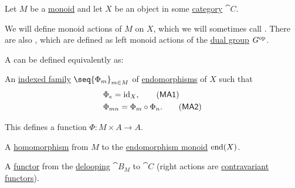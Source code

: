 \begin{definition}\label{def:monoid_action}
  Let \( M \) be a \hyperref[def:unital_magma/monoid]{monoid} and let \( X \) be an object in some \hyperref[def:category]{category} \( \cat{C} \).

  We will define monoid actions of \( M \) on \( X \), which we will sometimes call . There are also , which are defined as left monoid actions of the \hyperref[def:group/duality]{dual group} \( G^{\operatorname{op}} \).

  A  can be defined equivalently as:
  \begin{thmenum}
     An \hyperref[def:cartesian_product/indexed_family]{indexed family} \( \seq{ \Phi_m }_{m \in M} \) of \hyperref[def:morphism_invertibility/endomorphism]{endomorphisms} of \( X \) such that
    \begin{align}
      &\Phi_e = \id_X, \label{eq:def:monoid_action/family/identity}\tag{\logic{MA1}} \\
      &\Phi_{mn} = \Phi_m \bincirc \Phi_n. \label{eq:def:monoid_action/family/compatibility}\tag{\logic{MA2}}
    \end{align}

    This defines a function \( \Phi: M \times A \to A \).

     A \hyperref[def:unital_magma/homomorphism]{homomorphism} from \( M \) to the \hyperref[def:endomorphism_monoid]{endomorphism monoid} \( \operatorname{end}(X) \).

     A \hyperref[def:functor]{functor} from the \hyperref[def:monoid_delooping]{delooping} \( \cat{B}_M \) to \( \cat{C} \) (right actions are \hyperref[rem:contravariant_functor]{contravariant functors}).
  \end{thmenum}
\end{definition}
